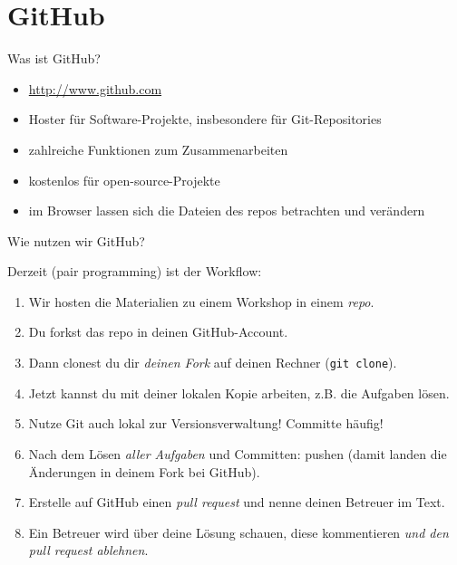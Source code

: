 \section{GitHub}

\begin{frame}{Was ist GitHub?}
	\begin{itemize}
		\item \url{http://www.github.com}
		\item Hoster für Software-Projekte, insbesondere für Git-Repositories
		\item zahlreiche Funktionen zum Zusammenarbeiten
		\item kostenlos für open-source-Projekte
		\item im Browser lassen sich die Dateien des repos betrachten und verändern
	\end{itemize}
\end{frame}

\begin{frame}[fragile]{Wie nutzen wir GitHub?}
	\small{
	Derzeit (pair programming) ist der Workflow:
	
	\begin{enumerate}
		\item Wir hosten die Materialien zu einem Workshop in einem \emph{repo}.
		\item Du forkst das repo in deinen GitHub-Account.
		\item Dann clonest du dir \emph{deinen Fork} auf deinen Rechner (\verb|git clone|).
		\item Jetzt kannst du mit deiner lokalen Kopie arbeiten, z.B. die Aufgaben lösen.
		\item Nutze Git auch lokal zur Versionsverwaltung! Committe häufig!
		\item Nach dem Lösen \emph{aller Aufgaben} und Committen: pushen (damit landen die Änderungen in deinem Fork bei GitHub).
		\item Erstelle auf GitHub einen \emph{pull request} und nenne deinen Betreuer im Text.
		\item Ein Betreuer wird über deine Lösung schauen, diese kommentieren \emph{und den pull request ablehnen}.
	\end{enumerate}
	}
\end{frame}
